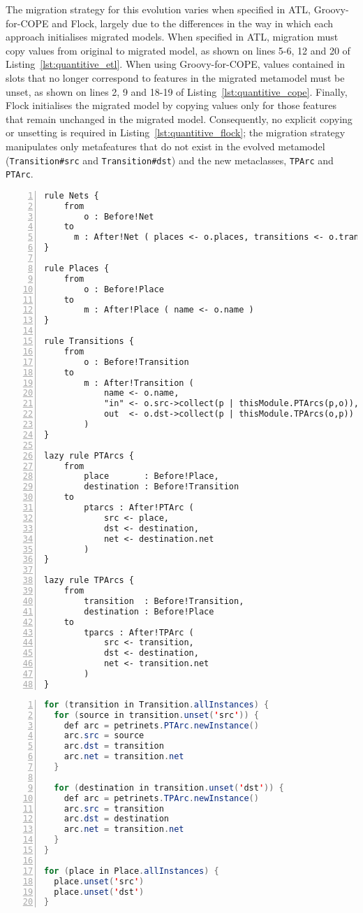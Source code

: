 The migration strategy for this evolution varies when specified in ATL, Groovy-for-COPE and Flock, largely due to the differences in the way in which each approach initialises migrated models. When specified in ATL, migration must copy values from original to migrated model, as shown on lines 5-6, 12 and 20 of Listing~\ref{lst:quantitive_etl}. When using Groovy-for-COPE, values contained in slots that no longer correspond to features in the migrated metamodel must be unset, as shown on lines 2, 9 and 18-19 of Listing~\ref{lst:quantitive_cope}. Finally, Flock initialises the migrated model by copying values only for those features that remain unchanged in the migrated model. Consequently, no explicit copying or unsetting is required in Listing~\ref{lst:quantitive_flock}; the migration strategy manipulates only metafeatures that do not exist in the evolved metamodel (\texttt{Transition\#src} and \texttt{Transition\#dst}) and the new metaclasses, \texttt{TPArc} and \texttt{PTArc}.

\begin{lstlisting}[basicstyle=\ttfamily\footnotesize, flexiblecolumns=true, numbers=left, nolol=true, caption=Petri nets model migration in ATL, label=lst:quantitive_etl, language=ETL, tabsize=2]
rule Nets {
	from
		o : Before!Net
	to
	  m : After!Net ( places <- o.places, transitions <- o.transitions )
}

rule Places {
	from
		o : Before!Place
	to
		m : After!Place ( name <- o.name )
}

rule Transitions {
	from
		o : Before!Transition
	to
		m : After!Transition (
			name <- o.name,
			"in" <- o.src->collect(p | thisModule.PTArcs(p,o)),
			out  <- o.dst->collect(p | thisModule.TPArcs(o,p))
		)
}

lazy rule PTArcs {
	from
		place       : Before!Place,
		destination : Before!Transition
	to
		ptarcs : After!PTArc (
			src <- place,
			dst <- destination,
			net <- destination.net
		)
}

lazy rule TPArcs {
	from
		transition  : Before!Transition,
		destination : Before!Place
	to
		tparcs : After!TPArc (
			src <- transition,
			dst <- destination,
			net <- transition.net
		)
}
\end{lstlisting}


\begin{lstlisting}[basicstyle=\ttfamily\footnotesize, flexiblecolumns=true, numbers=left, nolol=true, caption=Petri nets model migration in COPE, label=lst:quantitive_cope, language=Java, tabsize=2]
for (transition in Transition.allInstances) {
  for (source in transition.unset('src')) {
    def arc = petrinets.PTArc.newInstance()
    arc.src = source
    arc.dst = transition
    arc.net = transition.net
  }

  for (destination in transition.unset('dst')) {
    def arc = petrinets.TPArc.newInstance() 
    arc.src = transition
    arc.dst = destination
    arc.net = transition.net
  }
}

for (place in Place.allInstances) {
  place.unset('src')
  place.unset('dst')
}
\end{lstlisting}


